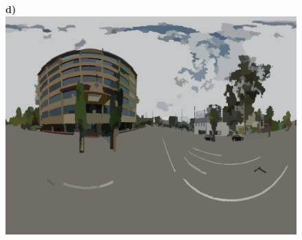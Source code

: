\documentclass[final,3p,times,authoryear]{elsarticle}
\begin{document}
\begin{figure}
\textbf{d)}\includegraphics[scale=0.08]{Images/mean/4880_7_8_300.png} 


\end{figure}
\end{document}
